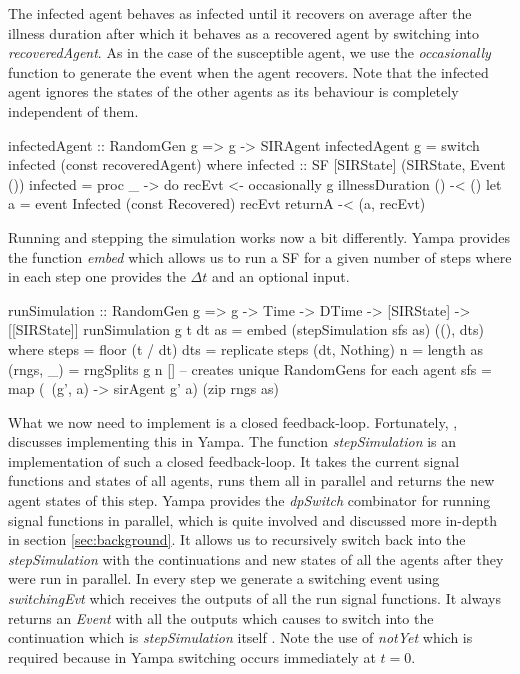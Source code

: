 The infected agent behaves as infected until it recovers on average after the illness duration after which it behaves as a recovered agent by switching into \textit{recoveredAgent}. As in the case of the susceptible agent, we use the \textit{occasionally} function to generate the event when the agent recovers. Note that the infected agent ignores the states of the other agents as its behaviour is completely independent of them.

\begin{HaskellCode}
infectedAgent :: RandomGen g => g -> SIRAgent
infectedAgent g = switch infected (const recoveredAgent)
  where
    infected :: SF [SIRState] (SIRState, Event ())
    infected = proc _ -> do
      recEvt <- occasionally g illnessDuration () -< ()
      let a = event Infected (const Recovered) recEvt
      returnA -< (a, recEvt)
\end{HaskellCode}

Running and stepping the simulation works now a bit differently. Yampa provides the function \textit{embed} which allows us to run a SF for a given number of steps where in each step one provides the $\Delta t$ and an optional input.

\begin{HaskellCode}
runSimulation :: RandomGen g => g -> Time -> DTime -> [SIRState] -> [[SIRState]]
runSimulation g t dt as = embed (stepSimulation sfs as) ((), dts)
  where
    steps     = floor (t / dt)
    dts       = replicate steps (dt, Nothing)
    n         = length as
    (rngs, _) = rngSplits g n [] -- creates unique RandomGens for each agent
    sfs       = map (\ (g', a) -> sirAgent g' a) (zip rngs as)
\end{HaskellCode}

What we now need to implement is a closed feedback-loop. Fortunately, \cite{nilsson_functional_2002}, \cite{courtney_yampa_2003} discusses implementing this in Yampa. The function \textit{stepSimulation} is an implementation of such a closed feedback-loop. It takes the current signal functions and states of all agents, runs them all in parallel and returns the new agent states of this step. Yampa provides the \textit{dpSwitch} combinator for running signal functions in parallel, which is quite involved and discussed more in-depth in section \ref{sec:background}. It allows us to recursively switch back into the \textit{stepSimulation} with the continuations and new states of all the agents after they were run in parallel.
In every step we generate a switching event using \textit{switchingEvt} which receives the outputs of all the run signal functions. It always returns an \textit{Event} with all the outputs which causes to switch into the continuation which is \textit{stepSimulation} itself . Note the use of \textit{notYet} which is required because in Yampa switching occurs immediately at $t = 0$.

